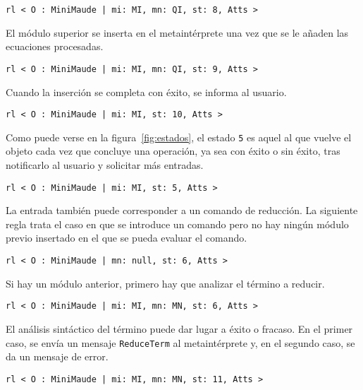 \begin{lstlisting}[language=Maude]
   rl < O : MiniMaude | mi: MI, mn: QI, st: 8, Atts >
\end{lstlisting}
\medskip

El módulo superior se inserta en el metaintérprete una vez que se le añaden las ecuaciones procesadas.

\begin{lstlisting}[language=Maude]
   rl < O : MiniMaude | mi: MI, mn: QI, st: 9, Atts >
\end{lstlisting}
\medskip

Cuando la inserción se completa con éxito, se informa al usuario.

\begin{lstlisting}[language=Maude]
   rl < O : MiniMaude | mi: MI, st: 10, Atts >
\end{lstlisting}
\medskip

Como puede verse en la figura~\ref{fig:estados}, el estado \texttt{5} es aquel al que vuelve el objeto cada vez que concluye una operación, ya sea con éxito o sin éxito, tras notificarlo al usuario y solicitar más entradas.

\begin{lstlisting}[language=Maude]
   rl < O : MiniMaude | mi: MI, st: 5, Atts >
\end{lstlisting}
\medskip

La entrada también puede corresponder a un comando de reducción. La siguiente regla trata el caso en que se introduce un comando pero no hay ningún módulo previo insertado en el que se pueda evaluar el comando.

\begin{lstlisting}[language=Maude]
   rl < O : MiniMaude | mn: null, st: 6, Atts >
\end{lstlisting}
\medskip

Si hay un módulo anterior, primero hay que analizar el término a reducir.

\begin{lstlisting}[language=Maude]
   rl < O : MiniMaude | mi: MI, mn: MN, st: 6, Atts >
\end{lstlisting}
\medskip

El análisis sintáctico del término puede dar lugar a éxito o fracaso. En el primer caso, se envía un mensaje \texttt{ReduceTerm} al metaintérprete y, en el segundo caso, se da un mensaje de error.

\begin{lstlisting}[language=Maude]
   rl < O : MiniMaude | mi: MI, mn: MN, st: 11, Atts >
\end{lstlisting}
\medskip

